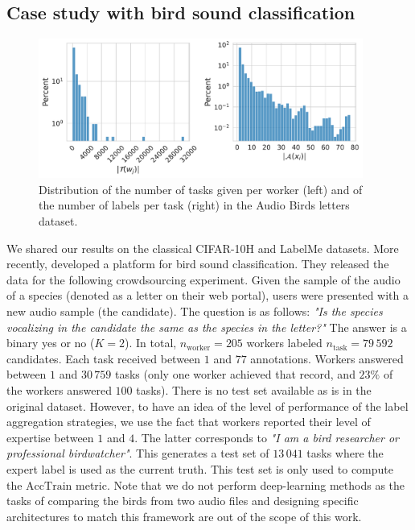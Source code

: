 \subsection{Case study with bird sound classification}
\begin{figure}[htb]
    \centering
    \includegraphics[width=0.95\textwidth]{./chapters/images_peerannot/fig-birdsrep-output-1.pdf}
    \caption{Distribution of the number of tasks given per worker (left) and of the number of labels per task (right) in the Audio Birds letters dataset.}
    \label{fig:birdsrep}
\end{figure}
We shared our results on the classical CIFAR-10H and LabelMe datasets.
More recently, \citet{lehikoinen2023successful} developed a platform for bird sound classification.
They released the data for the following crowdsourcing experiment.
Given the sample of the audio of a species (denoted as a letter on their web portal), users were presented with a new audio sample (the candidate).
The question is as follows: \emph{"Is the species vocalizing in the candidate the same as the species in the letter?"}
The answer is a binary yes or no ($K=2$).
In total, $n_{\text{worker}}=205$ workers labeled $n_{\text{task}}=79\, 592$ candidates.
Each task received between $1$ and $77$ annotations.
Workers answered between $1$ and $30\,759$ tasks (only one worker achieved that record, and $23\%$ of the workers answered $100$ tasks).
There is no test set available as is in the original dataset.
However, to have an idea of the level of performance of the label aggregation strategies, we use the fact that workers reported their level of expertise between $1$ and $4$.
The latter corresponds to \emph{"I am a bird researcher or professional birdwatcher"}.
This generates a test set of $13\,041$ tasks where the expert label is used as the current truth.
This test set is only used to compute the $\mathrm{AccTrain}$ metric.
Note that we do not perform deep-learning methods as the tasks of comparing the birds from two audio files and designing specific architectures to match this framework are out of the scope of this work.

